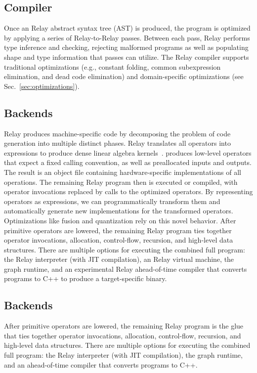   \subsection*{Compiler}
  Once an Relay abstract syntax tree (AST) is produced,
    the program is optimized by applying a series of Relay-to-Relay
    passes.
  Between each pass, Relay performs type inference and checking,
    rejecting malformed programs as well as populating shape and type
    information that passes can utilize.
  The Relay compiler supports traditional optimizations
    (e.g., constant folding, common subexpression elimination, and dead code elimination)
    and domain-specific optimizations
    (see Sec.~\ref{sec:optimizations}).

  \subsection*{Backends}


  Relay produces machine-specific code
    by decomposing the problem of code generation into multiple distinct phases.
  Relay translates all operators into \tvm expressions
    to produce dense linear algebra kernels~\citep{tvm_osdi18, tensor_comprehensions, halide}.
  \tvm produces low-level operators that expect a fixed calling convention,
    as well as preallocated inputs and outputs.
  The result is an object file containing hardware-specific implementations of all
    operations.
  The remaining Relay program then is executed or compiled,
    with operator invocations replaced by calls to the optimized operators.
  By representing operators as \tvm expressions, we can programmatically
    transform them and automatically generate new implementations for the transformed operators.
  Optimizations like fusion and quantization
    rely on this novel behavior.
  After primitive operators are lowered,
    the remaining Relay program ties
    together operator invocations, allocation, control-flow,
    recursion, and high-level data structures.
  There are multiple options for executing the combined full program:
    the Relay interpreter (with JIT compilation),
    an Relay virtual machine,
    the \tvm graph runtime,
    and an experimental Relay ahead-of-time compiler
    that converts programs to C++ to produce a target-specific binary.


  \subsection{Backends}
  After primitive operators are lowered,
    the remaining Relay program is the glue that ties
    together operator invocations, allocation, control-flow,
    recursion, and high-level data structures.
  There are multiple options for executing the combined full program:
      the Relay interpreter (with JIT compilation),
      the \tvm graph runtime,
      and an ahead-of-time compiler
      that converts programs to C++.

